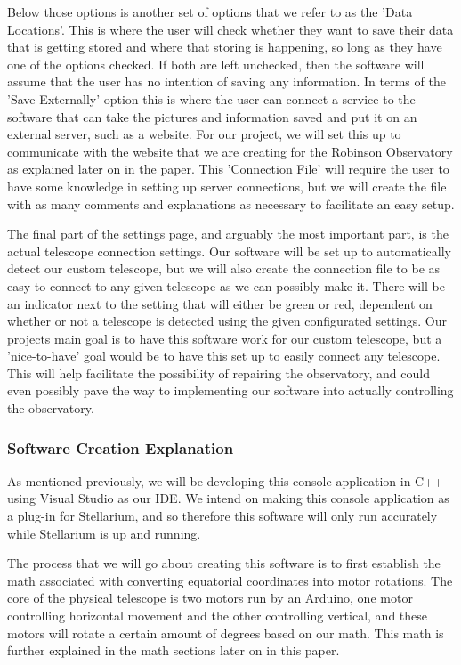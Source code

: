 \documentclass[12pt]{report}
\begin{document}
Below those options is another set of options that we refer to as the 'Data Locations'. This is where the user will check whether they want to save their data that is getting stored and where that storing is happening, so long as they have one of the options checked. If both are left unchecked, then the software will assume that the user has no intention of saving any information. In terms of the 'Save Externally' option this is where the user can connect a service to the software that can take the pictures and information saved and put it on an external server, such as a website. For our project, we will set this up to communicate with the website that we are creating for the Robinson Observatory as explained later on in the paper. This 'Connection File' will require the user to have some knowledge in setting up server connections, but we will create the file with as many comments and explanations as necessary to facilitate an easy setup.

\newpage

The final part of the settings page, and arguably the most important part, is the actual telescope connection settings. Our software will be set up to automatically detect our custom telescope, but we will also create the connection file to be as easy to connect to any given telescope as we can possibly make it. There will be an indicator next to the setting that will either be green or red, dependent on whether or not a telescope is detected using the given configurated settings. Our projects main goal is to have this software work for our custom telescope, but a 'nice-to-have' goal would be to have this set up to easily connect any telescope. This will help facilitate the possibility of repairing the observatory, and could even possibly pave the way to implementing our software into actually controlling the observatory.


\subsubsection*{Software Creation Explanation}

As mentioned previously, we will be developing this console application in C++ using Visual Studio as our IDE. We intend on making this console application as a plug-in for Stellarium, and so therefore this software will only run accurately while Stellarium is up and running.

The process that we will go about creating this software is to first establish the math associated with converting equatorial coordinates into motor rotations. The core of the physical telescope is two motors run by an Arduino, one motor controlling horizontal movement and the other controlling vertical, and these motors will rotate a certain amount of degrees based on our math. This math is further explained in the math sections later on in this paper.
\end{document}
